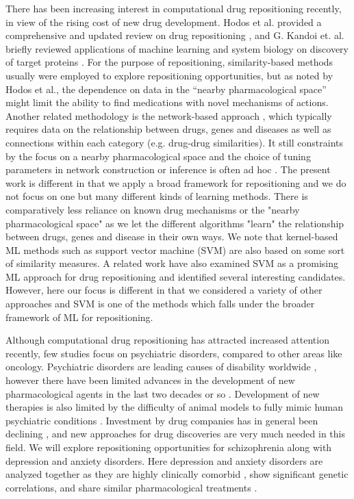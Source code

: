     There has been increasing interest in computational drug repositioning recently, in view of the rising cost of new drug development. Hodos et al. provided a comprehensive and updated review on drug repositioning \cite{hodos2016silico}, and G. Kandoi et. al. briefly reviewed applications of machine learning and system biology on discovery of target proteins \cite{kandoi2015prediction}. For the purpose of repositioning, similarity-based methods \cite{gottlieb2011predict,oh2014network,liu2015similarity,luo2016drug,napolitano2013drug,li2012new} usually were employed to explore repositioning opportunities, but as noted by Hodos et al., the dependence on data in the “nearby pharmacological space” might limit the ability to find medications with novel mechanisms of actions. Another related methodology is the network-based approach \cite{lotfi2018review}, which typically requires data on the relationship between drugs, genes and diseases as well as connections within each category (e.g. drug-drug similarities). It still constraints by the focus on a nearby pharmacological space and the choice of tuning parameters in network construction or inference is often ad hoc \cite{ferrero2017silico}. The present work is different in that we apply a broad framework for repositioning and we do not focus on one but many different kinds of learning methods. There is comparatively less reliance on known drug mechanisms or the "nearby pharmacological space" as we let the different algorithms "learn" the relationship between drugs, genes and disease in their own ways. We note that kernel-based ML methods such as support vector machine (SVM) are also based on some sort of similarity measures. A related work \cite{napolitano2013drug} have also examined SVM as a promising ML approach for drug repositioning and identified several interesting candidates. However, here our focus is different in that we considered a variety of other approaches and SVM is one of the methods which falls under the broader framework of ML for repositioning. 

    Although computational drug repositioning has attracted increased attention recently, few studies focus on psychiatric disorders, compared to other areas like oncology. Psychiatric disorders are leading causes of disability worldwide \cite{vigo2016estimating}, however there have been limited advances in the development of new pharmacological agents in the last two decades or so \cite{hyman2013psychiatric}. Development of new therapies is also limited by the difficulty of animal models to fully mimic human psychiatric conditions \cite{nestler2010animal}. Investment by drug companies has in general been declining \cite{hyman2013psychiatric} , and new approaches for drug discoveries are very much needed in this field. We will explore repositioning opportunities for schizophrenia along with depression and anxiety disorders. Here depression and anxiety disorders are analyzed together as they are highly clinically comorbid \cite{kessler2015anxious,otowa2016meta}, show significant genetic correlations\cite{otowa2016meta}, and share similar pharmacological treatments \cite{ballenger2000anxiety}.
    
